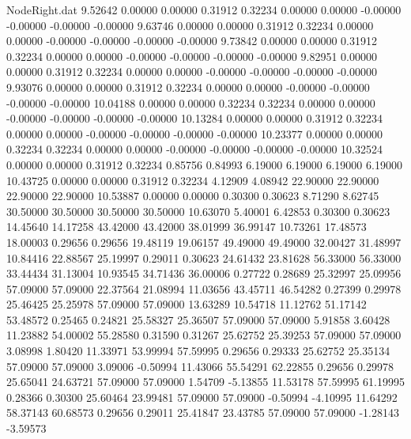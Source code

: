\begin{filecontents}{NodeRight.dat}
   9.52642    0.00000    0.00000     0.31912    0.32234    0.00000    0.00000   -0.00000   -0.00000   -0.00000   -0.00000
   9.63746    0.00000    0.00000     0.31912    0.32234    0.00000    0.00000   -0.00000   -0.00000   -0.00000   -0.00000
   9.73842    0.00000    0.00000     0.31912    0.32234    0.00000    0.00000   -0.00000   -0.00000   -0.00000   -0.00000
   9.82951    0.00000    0.00000     0.31912    0.32234    0.00000    0.00000   -0.00000   -0.00000   -0.00000   -0.00000
   9.93076    0.00000    0.00000     0.31912    0.32234    0.00000    0.00000   -0.00000   -0.00000   -0.00000   -0.00000
  10.04188    0.00000    0.00000     0.32234    0.32234    0.00000    0.00000   -0.00000   -0.00000   -0.00000   -0.00000
  10.13284    0.00000    0.00000     0.31912    0.32234    0.00000    0.00000   -0.00000   -0.00000   -0.00000   -0.00000
  10.23377    0.00000    0.00000     0.32234    0.32234    0.00000    0.00000   -0.00000   -0.00000   -0.00000   -0.00000
  10.32524    0.00000    0.00000     0.31912    0.32234    0.85756    0.84993    6.19000    6.19000    6.19000    6.19000
  10.43725    0.00000    0.00000     0.31912    0.32234    4.12909    4.08942   22.90000   22.90000   22.90000   22.90000
  10.53887    0.00000    0.00000     0.30300    0.30623    8.71290    8.62745   30.50000   30.50000   30.50000   30.50000
  10.63070    5.40001    6.42853     0.30300    0.30623   14.45640   14.17258   43.42000   43.42000   38.01999   36.99147
  10.73261   17.48573   18.00003     0.29656    0.29656   19.48119   19.06157   49.49000   49.49000   32.00427   31.48997
  10.84416   22.88567   25.19997     0.29011    0.30623   24.61432   23.81628   56.33000   56.33000   33.44434   31.13004
  10.93545   34.71436   36.00006     0.27722    0.28689   25.32997   25.09956   57.09000   57.09000   22.37564   21.08994
  11.03656   43.45711   46.54282     0.27399    0.29978   25.46425   25.25978   57.09000   57.09000   13.63289   10.54718
  11.12762   51.17142   53.48572     0.25465    0.24821   25.58327   25.36507   57.09000   57.09000    5.91858    3.60428
  11.23882   54.00002   55.28580     0.31590    0.31267   25.62752   25.39253   57.09000   57.09000    3.08998    1.80420
  11.33971   53.99994   57.59995     0.29656    0.29333   25.62752   25.35134   57.09000   57.09000    3.09006   -0.50994
  11.43066   55.54291   62.22855     0.29656    0.29978   25.65041   24.63721   57.09000   57.09000    1.54709   -5.13855
  11.53178   57.59995   61.19995     0.28366    0.30300   25.60464   23.99481   57.09000   57.09000   -0.50994   -4.10995
  11.64292   58.37143   60.68573     0.29656    0.29011   25.41847   23.43785   57.09000   57.09000   -1.28143   -3.59573

\end{filecontents}
